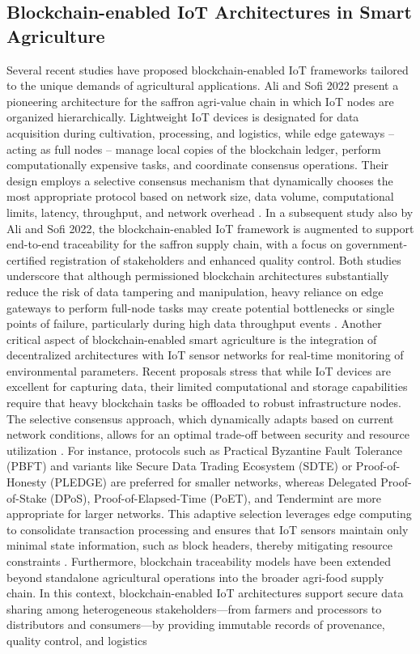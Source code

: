 \documentclass[12pt,onecolumn]{IEEEtran} %
\begin{document}
\subsection*{Blockchain-enabled IoT Architectures in Smart Agriculture}  Several recent studies have proposed blockchain-enabled IoT frameworks tailored to the unique demands of agricultural applications. Ali and Sofi 2022 present a pioneering architecture for the saffron agri-value chain in which IoT nodes are organized hierarchically. Lightweight IoT devices is designated for data acquisition during cultivation, processing, and logistics, while edge gateways -- acting as full nodes -- manage local copies of the blockchain ledger, perform computationally expensive tasks, and coordinate consensus operations. Their design employs a selective consensus mechanism that dynamically chooses the most appropriate protocol based on network size, data volume, computational limits, latency, throughput, and network overhead \cite{ali2022blockchainenabledarchitecture}. In a subsequent study also by Ali and Sofi 2022, the blockchain-enabled IoT framework is augmented to support end-to-end traceability for the saffron supply chain, with a focus on government-certified registration of stakeholders and enhanced quality control. Both studies underscore that although permissioned blockchain architectures substantially reduce the risk of data tampering and manipulation, heavy reliance on edge gateways to perform full-node tasks may create potential bottlenecks or single points of failure, particularly during high data throughput events \cite{ali2022blockchainenabledarchitecture}.  Another critical aspect of blockchain-enabled smart agriculture is the integration of decentralized architectures with IoT sensor networks for real-time monitoring of environmental parameters. Recent proposals stress that while IoT devices are excellent for capturing data, their limited computational and storage capabilities require that heavy blockchain tasks be offloaded to robust infrastructure nodes. The selective consensus approach, which dynamically adapts based on current network conditions, allows for an optimal trade-off between security and resource utilization \cite{ali2022blockchainenabledarchitecture}. For instance, protocols such as Practical Byzantine Fault Tolerance (PBFT) and variants like Secure Data Trading Ecosystem (SDTE) or Proof-of-Honesty (PLEDGE) are preferred for smaller networks, whereas Delegated Proof-of-Stake (DPoS), Proof-of-Elapsed-Time (PoET), and Tendermint are more appropriate for larger networks. This adaptive selection leverages edge computing to consolidate transaction processing and ensures that IoT sensors maintain only minimal state information, such as block headers, thereby mitigating resource constraints \cite{ali2022blockchainenabledarchitecture}.  Furthermore, blockchain traceability models have been extended beyond standalone agricultural operations into the broader agri-food supply chain. In this context, blockchain-enabled IoT architectures support secure data sharing among heterogeneous stakeholders---from farmers and processors to distributors and consumers---by providing immutable records of provenance, quality control, and logistics 
\end{document}
